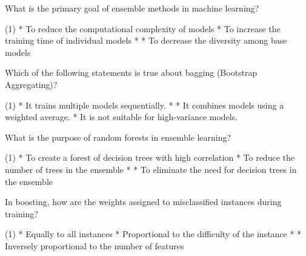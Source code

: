 \documentclass[10pt]{extarticle}
\begin{document}
\begin{exercise}
    What is the primary goal of ensemble methods in machine learning?
    \begin{choice}(1)
        * To reduce the computational complexity of models
        * To increase the training time of individual models
        * 
        * To decrease the diversity among base models
    \end{choice}
\end{exercise}
\begin{solution}
\end{solution}

\begin{exercise}
    Which of the following statements is true about bagging (Bootstrap Aggregating)?
    \begin{choice} (1)
        * It trains multiple models sequentially.
        * 
        * It combines models using a weighted average.
        * It is not suitable for high-variance models.
    \end{choice}
\end{exercise}
\begin{solution}
\end{solution}

\begin{exercise}
    What is the purpose of random forests in ensemble learning?
    \begin{choice}(1)
        * To create a forest of decision trees with high correlation
        * To reduce the number of trees in the ensemble
        * 
        * To eliminate the need for decision trees in the ensemble
    \end{choice}
\end{exercise}
\begin{solution}
\end{solution}

\begin{exercise}
    In boosting, how are the weights assigned to misclassified instances during training?
    \begin{choice} (1)
        * Equally to all instances
        * Proportional to the difficulty of the instance
        * 
        * Inversely proportional to the number of features
    \end{choice}
\end{exercise}
\begin{solution}
\end{solution}
\end{document}
